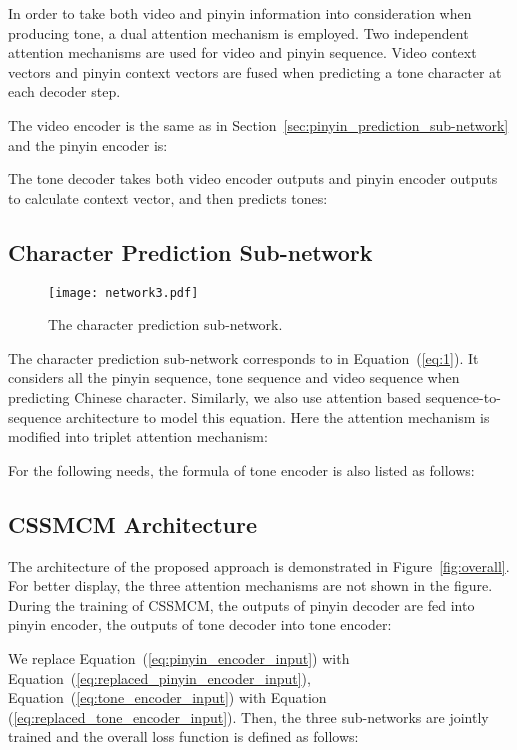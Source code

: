 \documentclass[sigconf]{acmart}
\begin{document}
In order to take both video and pinyin information into consideration when producing tone, a dual attention mechanism \cite{chung2017lipWild} is employed. Two independent attention mechanisms are used for video and pinyin sequence. Video context vectors  and pinyin context vectors  are fused when predicting a tone character at each decoder step.

The video encoder is the same as in Section~\ref{sec:pinyin_prediction_sub-network} and the pinyin encoder is:

The tone decoder takes both video encoder outputs and pinyin encoder outputs to calculate context vector, and then predicts tones:
 




\subsection{Character Prediction Sub-network}
\begin{figure}
\centering
\texttt{[image: network3.pdf]}
\caption{The character prediction sub-network.}\label{fig:network3}
\end{figure}
The character prediction sub-network corresponds to  in Equation~(\ref{eq:1}).
It considers all the pinyin sequence, tone sequence and video sequence when predicting Chinese character. Similarly, we also use attention based sequence-to-sequence architecture to model this equation. Here the attention mechanism is modified into triplet attention mechanism:

 





For the following needs, the formula of tone encoder is also listed as follows:


\subsection{CSSMCM Architecture}
The architecture of the proposed approach is demonstrated in Figure~\ref{fig:overall}. For better display, the three attention mechanisms are not shown in the figure. During the training of CSSMCM, the outputs of pinyin decoder are fed into pinyin encoder, the outputs of tone decoder into tone encoder:



We replace Equation~(\ref{eq:pinyin_encoder_input}) with Equation~(\ref{eq:replaced_pinyin_encoder_input}), Equation~(\ref{eq:tone_encoder_input}) with Equation (\ref{eq:replaced_tone_encoder_input}). Then, the three sub-networks are jointly trained and the overall loss function is defined as follows:
\end{document}
